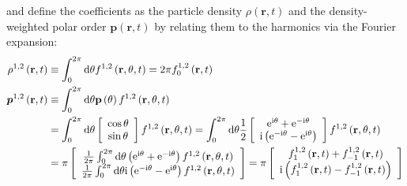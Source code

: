 \documentclass{article}
\begin{document}
and define the coefficients  as the particle density $ \rho\left(\mathbf{r}, t\right)$ and the density-weighted polar order $\boldsymbol{p}\left(\mathbf{r}, t\right)$ by relating them to the harmonics via the Fourier expansion:
\begin{subequations}
    \begin{align}
        \rho^{1,2} \left( \mathbf{r},t \right) &\equiv \int_0^{2\pi}{\mathrm{d}\theta f^{1,2}\left( \mathbf{r},\theta ,t \right)}=2\pi f_{0}^{1,2}\left( \mathbf{r},t \right)
        \label{eq:particleDensity}
        \\
        \boldsymbol{p}^{1,2}\left( \mathbf{r},t \right) &\equiv \int_0^{2\pi}{\mathrm{d}\theta \mathbf{p}\left( \theta \right) f^{1,2}\left( \mathbf{r},\theta ,t \right)}\notag\\
        &=\int_0^{2\pi}{\mathrm{d}\theta \left[ \begin{array}{c}
        \cos \theta\\
        \sin \theta\\
    \end{array} \right] f^{1,2}\left( \mathbf{r},\theta ,t \right)}=\int_0^{2\pi}{\mathrm{d}\theta \frac{1}{2}\left[ \begin{array}{c}
        \mathrm{e}^{\mathrm{i}\theta}+\mathrm{e}^{-\mathrm{i}\theta}\\
        \mathrm{i}\left( \mathrm{e}^{-\mathrm{i}\theta}-\mathrm{e}^{\mathrm{i}\theta} \right)\\
    \end{array} \right] f^{1,2}\left( \mathbf{r},\theta ,t \right)}\notag\\
        &=\pi \left[ \begin{array}{c}
        \frac{1}{2\pi}\int_0^{2\pi}{\mathrm{d}\theta \left( \mathrm{e}^{\mathrm{i}\theta}+\mathrm{e}^{-\mathrm{i}\theta} \right) f^{1,2}\left( \mathbf{r},\theta ,t \right)}\\
        \frac{1}{2\pi}\int_0^{2\pi}{\mathrm{d}\theta \mathrm{i}\left( \mathrm{e}^{-\mathrm{i}\theta}-\mathrm{e}^{\mathrm{i}\theta} \right) f^{1,2}\left( \mathbf{r},\theta ,t \right)}\\
    \end{array} \right] =\pi \left[ \begin{array}{c}
        f_{1}^{1,2}\left( \mathbf{r},t \right) +f_{-1}^{1,2}\left( \mathbf{r},t \right)\\
        \mathrm{i}\left( f_{1}^{1,2}\left( \mathbf{r},t \right) -f_{-1}^{1,2}\left( \mathbf{r},t \right) \right)\\
    \end{array} \right]
    \label{eq:polarOrder}
    \end{align}
\end{subequations}
\end{document}
